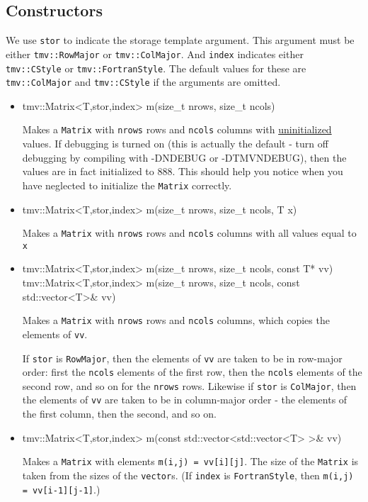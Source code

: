 \documentclass[twoside,letterpaper,11pt]{article}
\renewcommand{\tt}[1]{{\lstinline {#1}}}
\begin{document}
\subsection{Constructors}
\label{Matrix_Constructors}

We use \tt{stor} to indicate the storage template argument. 
This argument must be either 
\tt{tmv::RowMajor} or \tt{tmv::ColMajor}.  And \tt{index} indicates either 
\tt{tmv::CStyle} or \tt{tmv::FortranStyle}.  The default values for these
are \tt{tmv::ColMajor} and \tt{tmv::CStyle} if the arguments are omitted.

\begin{itemize}
\item 
\begin{tmvcode}
tmv::Matrix<T,stor,index> m(size_t nrows, size_t ncols)
\end{tmvcode}
Makes a \tt{Matrix} with \tt{nrows} rows and \tt{ncols} columns with 
\underline{uninitialized} values.
If debugging is turned on (this is actually the default -
turn off debugging by compiling
with -DNDEBUG or -DTMVNDEBUG), then the values are in fact initialized to 888.  
This should help you notice
when you have neglected to initialize the \tt{Matrix} correctly.

\item
\begin{tmvcode}
tmv::Matrix<T,stor,index> m(size_t nrows, size_t ncols, T x)
\end{tmvcode}
Makes a \tt{Matrix} with \tt{nrows} rows and \tt{ncols} columns with all 
values equal to \tt{x}

\item
\begin{tmvcode}
tmv::Matrix<T,stor,index> m(size_t nrows, size_t ncols, const T* vv)
tmv::Matrix<T,stor,index> m(size_t nrows, size_t ncols, 
      const std::vector<T>& vv)
\end{tmvcode}
Makes a \tt{Matrix} with \tt{nrows} rows and \tt{ncols} columns,
which copies the elements of \tt{vv}.

If \tt{stor} is \tt{RowMajor}, then the elements of \tt{vv} are taken to
be in row-major order: first the \tt{ncols} elements of the first row, then the
\tt{ncols} elements of the second row, and so on for the \tt{nrows} rows.
Likewise if \tt{stor} is \tt{ColMajor},
then the elements of \tt{vv} are taken to be in column-major order - 
the elements of the first column, then the second, and so on.

\item
\begin{tmvcode}
tmv::Matrix<T,stor,index> m(const std::vector<std::vector<T> >& vv)
\end{tmvcode}
Makes a \tt{Matrix} with elements \tt{m(i,j) = vv[i][j]}.  The size of
the \tt{Matrix} is taken from the sizes of the \tt{vector}s.  
(If \tt{index} is \tt{FortranStyle}, then \tt{m(i,j) = vv[i-1][j-1]}.)


\end{itemize}
\end{document}
